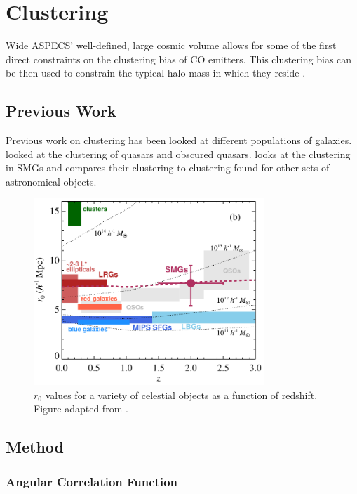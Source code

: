 \chapter{Clustering}

Wide ASPECS' well-defined, large cosmic volume allows for some of the first direct constraints on the clustering bias of CO emitters. This clustering bias can be then used to constrain the typical halo mass in which they reside \cite{10.1111/j.1365-2966.2011.20303.x}.

\section{Previous Work}

Previous work on clustering has been looked at different populations of galaxies. \cite{hickox2011clustering} looked at the clustering of quasars and obscured quasars. \cite{10.1111/j.1365-2966.2011.20303.x} looks at the clustering in SMGs and compares their clustering to clustering found for other sets of astronomical objects. 

\begin{figure}[!htb]
\centering \includegraphics[width=87mm]{clustering/Hickox2012_Compare.png}
\caption{$r_0$ values for a variety of celestial objects as a function of redshift. Figure adapted from \cite{10.1111/j.1365-2966.2011.20303.x}.}
\label{fig:Hickox_compare}
\end{figure}

\section{Method}

\subsection{Angular Correlation Function}


